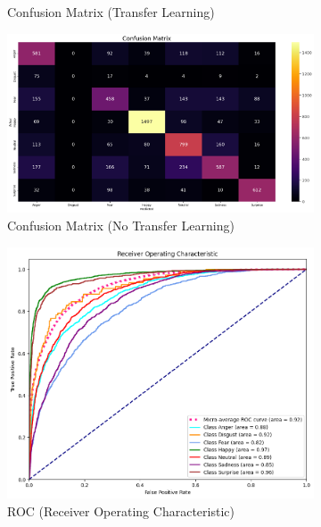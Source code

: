 \documentclass[conference]{IEEEtran}
\begin{document}
\begin{figure}[htbp]
\begin{subfigure}{0.22\textwidth}
        \caption{Confusion Matrix (Transfer Learning)}
        \label{fig:confmat_tl}
    \end{subfigure}
    \begin{subfigure}{0.22\textwidth}
        \includegraphics[width=\textwidth]{Figures/Confusion matrix - no TL.png}
        \caption{Confusion Matrix (No Transfer Learning)}
        \label{fig:confmat_no_tl}
    \end{subfigure}
    \begin{subfigure}{0.22\textwidth}
        \includegraphics[width=\textwidth]{Figures/ROC.png}
        \caption{ROC (Receiver Operating Characteristic)}
        \label{fig:roc_tl}
    \end{subfigure}
    \begin{subfigure}{0.22\textwidth}

\end{subfigure}
\end{figure}
\end{document}
